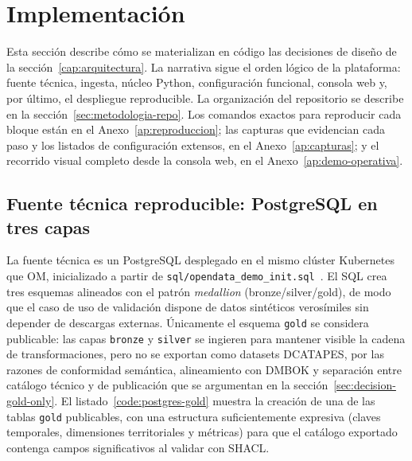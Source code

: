 \section{Implementación}\label{cap:implementacion}

Esta sección describe cómo se materializan en código las decisiones de diseño de la sección~\ref{cap:arquitectura}. La narrativa sigue el orden lógico de la plataforma: fuente técnica, ingesta, núcleo Python, configuración funcional, consola web y, por último, el despliegue reproducible. La organización del repositorio se describe en la sección~\ref{sec:metodologia-repo}. Los comandos exactos para reproducir cada bloque están en el Anexo~\ref{ap:reproduccion}; las capturas que evidencian cada paso y los listados de configuración extensos, en el Anexo~\ref{ap:capturas}; y el recorrido visual completo desde la consola web, en el Anexo~\ref{ap:demo-operativa}.

\subsection{Fuente técnica reproducible: PostgreSQL en tres capas}\label{sec:implementacion-postgres}

La fuente técnica es un PostgreSQL desplegado en el mismo clúster Kubernetes que \ac{OM}, inicializado a partir de \texttt{sql/opendata\_demo\_init.sql}~\cite{postgresqlDocs}. El \ac{SQL} crea tres esquemas alineados con el patrón \emph{medallion} (bronze/silver/gold), de modo que el caso de uso de validación dispone de datos sintéticos verosímiles sin depender de descargas externas. Únicamente el esquema \texttt{gold} se considera publicable: las capas \texttt{bronze} y \texttt{silver} se ingieren para mantener visible la cadena de transformaciones, pero no se exportan como datasets \ac{DCATAPES}, por las razones de conformidad semántica, alineamiento con \ac{DMBOK} y separación entre catálogo técnico y de publicación que se argumentan en la sección~\ref{sec:decision-gold-only}. El listado~\ref{code:postgres-gold} muestra la creación de una de las tablas \texttt{gold} publicables, con una estructura suficientemente expresiva (claves temporales, dimensiones territoriales y métricas) para que el catálogo exportado contenga campos significativos al validar con \ac{SHACL}.

